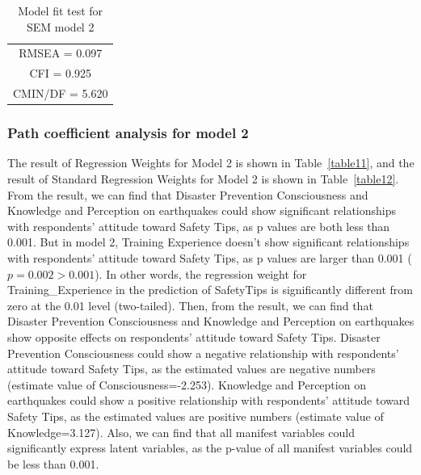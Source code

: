 \begin{table}[h]
  \caption{Model fit test for SEM model 2}
  \label{table16}
  \centering 
  \begin{tabular}{|c|}
  \hline
  RMSEA = 0.097 \\
  CFI = 0.925 \\
  CMIN/DF = 5.620 \\
  \hline
  \end{tabular}
\end{table}

\subsubsection{Path coefficient analysis for model 2}
The result of Regression Weights for Model 2 is shown in Table~\ref{table11}, and the result of Standard Regression Weights for Model 2 is shown in Table~\ref{table12}. From the result, we can find that Disaster Prevention Consciousness and Knowledge and Perception on earthquakes could show significant relationships with respondents' attitude toward Safety Tips, as p values are both less than 0.001. But in model 2, Training Experience doesn't show significant relationships with respondents' attitude toward Safety Tips, as p values are larger than 0.001 ($p=0.002>0.001$). In other words, the regression weight for Training\_Experience in the prediction of SafetyTips is significantly different from zero at the 0.01 level (two-tailed). Then, from the result, we can find that Disaster Prevention Consciousness and Knowledge and Perception on earthquakes show opposite effects on respondents' attitude toward Safety Tips. Disaster Prevention Consciousness could show a negative relationship with respondents' attitude toward Safety Tips, as the estimated values are negative numbers (estimate value of Consciousness=-2.253). Knowledge and Perception on earthquakes could show a positive relationship with respondents' attitude toward Safety Tips, as the estimated values are positive numbers (estimate value of Knowledge=3.127). Also, we can find that all manifest variables could significantly express latent variables, as the p-value of all manifest variables could be less than 0.001. 

